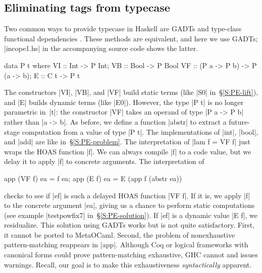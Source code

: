 \subsection{Eliminating tags from typecase}
\label{S:PE-GADT}

Two common ways to provide typecase in Haskell are
GADTs and type-class functional dependencies
\cite{oliveira-typecase}.  These
methods are equivalent, and here we use GADTs; |incope1.hs|
in the accompanying source code shows the latter.
\vspace*{-0.7em}
\begin{code3}
data P t where
  VI :: Int  -> P Int;                VB :: Bool -> P Bool
  VF :: (P a -> P b) -> P (a -> b);   E  :: C t -> P t
\end{code3}
\vspace*{-0.7em}
The constructors |VI|, |VB|, and |VF| build static terms (like |S0|
in~\S\ref{S:PE-lift}), and |E| builds dynamic terms (like |E0|).  However,
the type |P t| is no longer parametric in~|t|: the constructor |VF| takes an
operand of type |P a -> P b| rather than |a -> b|. As before, we define a
function |abstr| to extract a future-stage computation from a value of 
type |P t|. The implementations of |int|, |bool|, and |add| are like
in~\S\ref{S:PE-problem}.
The interpretation of |lam f = VF f| just wraps the HOAS function |f|. 
We can always compile |f| to a code value,
but we delay it to apply |f| to concrete arguments. The interpretation of
\vspace*{-0.7em}
\begin{code3}
app (VF f) ea = f ea;  app (E f)  ea = E (app f (abstr ea))
\end{code3}
\vspace*{-0.7em}
checks to see if |ef| is such a delayed
HOAS function |VF f|. If it is, we apply |f| to the
concrete argument |ea|, giving us a chance to perform static
computations (see example |testpowfix7| in~\S\ref{S:PE-solution}). If |ef| is a
dynamic value |E f|, we residualize.
This solution using GADTs works but is not quite satisfactory. First, it
cannot be ported to MetaOCaml.  Second,
the problem of nonexhaustive pattern\hyp matching reappears in
|app|. Although Coq or logical
frameworks with canonical forms could prove pattern-matching
exhaustive, GHC cannot and issues warnings. Recall, our goal is to
make this exhaustiveness \emph{syntactically} apparent.

